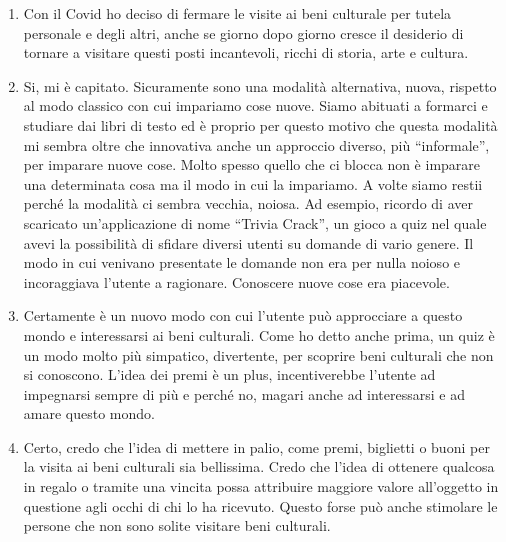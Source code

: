\documentclass{article}
\begin{document}
\begin{enumerate}
\item Con il Covid ho deciso di fermare le visite ai beni culturale per tutela personale e degli altri, anche se giorno dopo giorno cresce il desiderio di tornare a visitare questi posti incantevoli, ricchi di storia, arte e cultura.
\item Si, mi è capitato. Sicuramente sono una modalità alternativa, nuova, rispetto al modo classico con cui impariamo cose nuove. Siamo abituati a formarci e studiare dai libri di testo ed è proprio per questo motivo che questa modalità mi sembra oltre che innovativa anche un approccio diverso, più “informale”, per imparare nuove cose. Molto spesso quello che ci blocca non è imparare una determinata cosa ma il modo in cui la impariamo. A volte siamo restii perché la modalità ci sembra vecchia, noiosa. Ad esempio, ricordo di aver scaricato un’applicazione di nome “Trivia Crack”, un gioco a quiz nel quale avevi la possibilità di sfidare diversi utenti su domande di vario genere. Il modo in cui venivano presentate le domande non era per nulla noioso e incoraggiava l’utente a ragionare. Conoscere nuove cose era piacevole.
\item Certamente è un nuovo modo con cui l’utente può approcciare a questo mondo e interessarsi ai beni culturali. Come ho detto anche prima, un quiz è un modo molto più simpatico, divertente, per scoprire beni culturali che non si conoscono. L’idea dei premi è un plus, incentiverebbe l’utente ad impegnarsi sempre di più e perché no, magari anche ad interessarsi e ad amare questo mondo.
\item Certo, credo che l’idea di mettere in palio, come premi, biglietti o buoni per la visita ai beni culturali sia bellissima. Credo che l’idea di ottenere qualcosa in regalo o tramite una vincita possa attribuire maggiore valore all’oggetto in questione agli occhi di chi lo ha ricevuto. Questo forse può anche stimolare le persone che non sono solite visitare beni culturali.
\end{enumerate}
\end{document}
